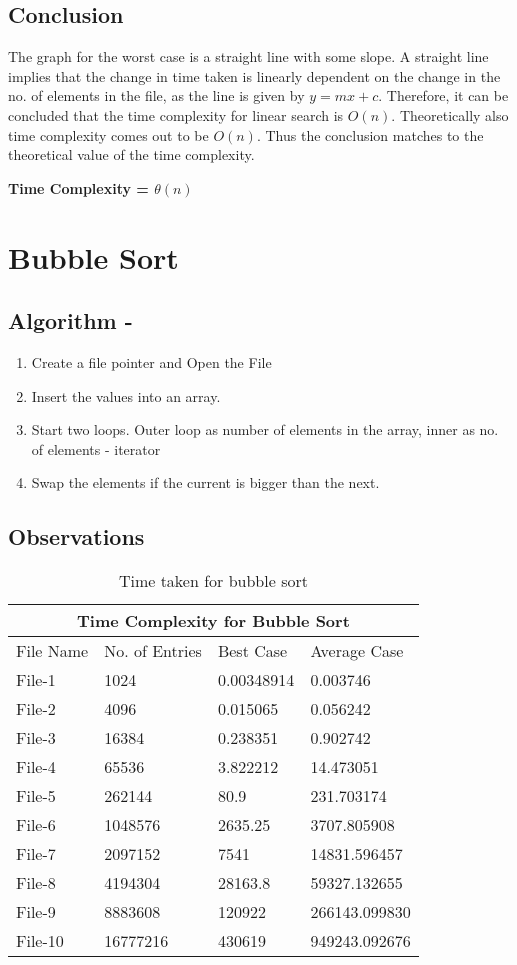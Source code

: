 \documentclass{article}
\begin{document}
\subsection{Conclusion}
The graph for the worst case is a straight line with some slope. A straight line implies that
the change in time taken is linearly dependent on the change in the no. of elements in the file,
as the line is given by $y = mx + c$.
Therefore, it can be concluded that the time complexity for linear search is $O(n)$.
Theoretically also time complexity comes out to be $O(n)$. Thus the conclusion matches to the theoretical
value of the time complexity.

\textbf{Time Complexity = $\theta(n)$}

\newpage
\section{Bubble Sort}
\subsection{Algorithm -}
\begin{enumerate}
 \item Create a file pointer and Open the File
 \item Insert the values into an array.
 \item Start two loops. Outer loop as number of elements in the array, inner as no. of elements - iterator
 \item Swap the elements if the current is bigger than the next.
\end{enumerate}
\subsection{Observations}
\begin{table}[h!] 
\centering     
\begin{tabular}{ | p{3cm} | p{3cm} | p{3cm} | p{3cm} | }  
 \hline
 \multicolumn{4}{|c|}{Time Complexity for Bubble Sort} \\
 \hline
 File Name & No. of Entries & Best Case & Average Case\\
 \hline
 File-1 & 1024 & 0.00348914 & 0.003746 \\ 
 File-2 & 4096 & 0.015065 & 0.056242 \\ 
 File-3 & 16384 & 0.238351 & 0.902742 \\ 
 File-4 & 65536 & 3.822212 & 14.473051 \\ 
 File-5 & 262144 & 80.9 & 231.703174 \\ 
 File-6 & 1048576 & 2635.25 & 3707.805908 \\ 
 File-7 & 2097152 & 7541 & 14831.596457 \\ 
 File-8 & 4194304 & 28163.8 & 59327.132655 \\ 
 File-9 & 8883608 & 120922 & 266143.099830 \\ 
 File-10 & 16777216 & 430619 & 949243.092676 \\[1ex]
 \hline
\end{tabular}
\caption{Time taken for bubble sort}
\end{table}
\newpage
\end{document}
